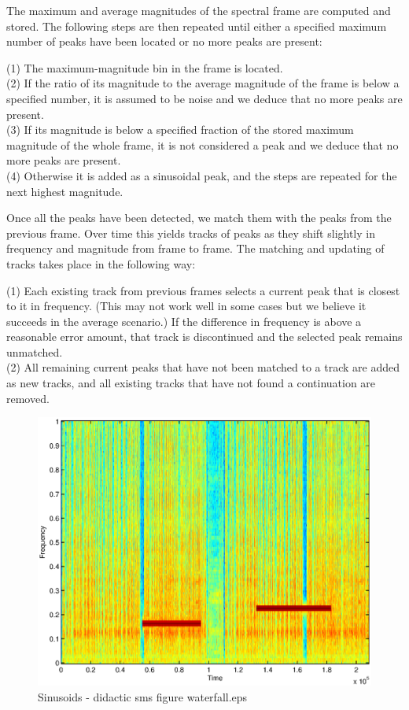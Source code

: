 \documentclass{acmsiggraph}               %
\begin{document}
The maximum and average 
magnitudes of the spectral frame are computed and stored. The following 
steps are then repeated until either a specified maximum number of peaks 
have been located or no more peaks are present: %

(1) The maximum-magnitude bin in the frame is located.\\
(2) If the ratio of its magnitude to the average magnitude of the frame is 
below a specified number, it is assumed to be noise and we deduce that no 
more peaks are present.\\
(3) If its magnitude is below a specified fraction of the stored maximum 
magnitude of the whole frame, it is not considered a peak and we deduce 
that no more peaks are present.\\
(4) Otherwise it is added as a sinusoidal peak, and the steps are repeated 
for the next highest magnitude.

Once all the peaks have been detected, we match them with the peaks from 
the previous frame. Over time this yields tracks of peaks as they shift 
slightly in frequency and magnitude from frame to frame. The matching and 
updating of tracks takes place in the following way:

(1) Each existing track from previous frames selects a current peak that is 
closest to it in frequency. (This may not work well in some cases but we 
believe it succeeds in the average scenario.) If the difference in 
frequency is above a reasonable error amount, that track is discontinued 
and the selected peak remains unmatched.\\
(2) All remaining current peaks that have not been matched to a track are 
added as new tracks, and all existing tracks that have not found a 
continuation are removed.

\begin{figure}[h]
\centering
\includegraphics[width=.95\columnwidth]{story1.eps}
\caption{Sinusoids - didactic sms figure waterfall.eps}
\end{figure}
\end{document}
